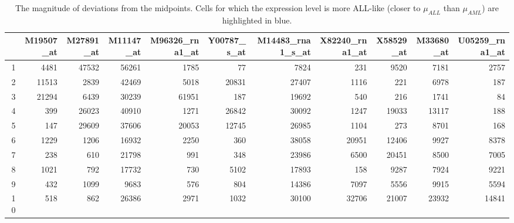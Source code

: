 \begin{table}[ht]
	\tiny
	\centering
	\begin{tabular}{r|rrrrr|rrrrr}
		\hline
		& M19507\_at & M27891\_at & M11147\_at & M96326\_rna1\_at & Y00787\_s\_at & M14483\_rna1\_s\_at & X82240\_rna1\_at & X58529\_at & M33680\_at & U05259\_rna1\_at \\ 
		\hline
		1 & 4481 \cellcolor{lightblue}& 47532 & 56261 & 1785 \cellcolor{lightblue}& 77 \cellcolor{lightblue}& 7824 & 231 & 9520 \cellcolor{lightblue} & 7181 & 2757 \\ 
		2 & 11513 & 2839 \cellcolor{lightblue}& 42469 & 5018 \cellcolor{lightblue}& 20831 & 27407 & 1116 & 221 & 6978 & 187 \\ 
		3 & 21294 & 6439 \cellcolor{lightblue}& 30239 & 61951 & 187 \cellcolor{lightblue} & 19692 & 540 & 216 & 1741 & 84 \\ 
		4 & 399 \cellcolor{lightblue}& 26023 & 40910 & 1271 \cellcolor{lightblue} & 26842 & 30092 \cellcolor{lightblue} & 1247 & 19033 \cellcolor{lightblue}& 13117 \cellcolor{lightblue} & 188 \\ 
		5 & 147 \cellcolor{lightblue}& 29609 & 37606 & 20053 & 12745 & 26985 & 1104 & 273 & 8701 & 168 \\ 
		6 & 1229 \cellcolor{lightblue}& 1206 \cellcolor{lightblue}& 16932 \cellcolor{lightblue}& 2250 \cellcolor{lightblue}& 360 \cellcolor{lightblue}& 38058 \cellcolor{lightblue}& 20951 \cellcolor{lightblue}& 12406 \cellcolor{lightblue}& 9927 \cellcolor{lightblue}& 8378 \cellcolor{lightblue} \\ 
		7 & 238 \cellcolor{lightblue}& 610 \cellcolor{lightblue}& 21798 \cellcolor{lightblue}& 991 \cellcolor{lightblue}& 348 \cellcolor{lightblue}& 23986 & 6500 \cellcolor{lightblue}& 20451 \cellcolor{lightblue} & 8500 & 7005 \cellcolor{lightblue}\\ 
		8 & 1021 \cellcolor{lightblue}& 792 \cellcolor{lightblue}& 17732 \cellcolor{lightblue}& 730 \cellcolor{lightblue}& 5102 \cellcolor{lightblue}& 17893 & 158 & 9287 \cellcolor{lightblue}& 7924 & 9221 \cellcolor{lightblue}\\ 
		9 & 432 \cellcolor{lightblue}& 1099 \cellcolor{lightblue}& 9683 \cellcolor{lightblue}& 576 \cellcolor{lightblue}& 804 \cellcolor{lightblue}& 14386 & 7097 \cellcolor{lightblue}& 5556 \cellcolor{lightblue}& 9915 \cellcolor{lightblue}& 5594 \cellcolor{lightblue}\\ 
		10 & 518 \cellcolor{lightblue}& 862 \cellcolor{lightblue}& 26386 & 2971 \cellcolor{lightblue}& 1032 \cellcolor{lightblue}& 30100 \cellcolor{lightblue}& 32706 \cellcolor{lightblue} & 21007 \cellcolor{lightblue}& 23932 \cellcolor{lightblue}& 14841 \cellcolor{lightblue}\\ 
		\hline
	\end{tabular}
	\caption{The magnitude of deviations from the midpoints. Cells for which the expression level is more ALL-like (closer to $\mu_{ALL}$ than $\mu_{AML}$) are highlighted in blue.}
	\label{golubTestDataMagnitudes}
\end{table}

